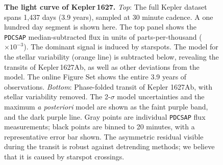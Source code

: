 \documentclass[12pt,modern,twocolumn,tighten]{aastex63}
\newcommand{\pn}{Kepler\,1627Ab} %
\begin{document}
\begin{figure}[tp]
	\begin{center}
		\leavevmode
	
	\end{center}
	\vspace{-0.7cm}
  \caption{ {\bf The light curve of Kepler\,1627.}
    {\it Top}: 
    The full Kepler dataset spans 1{,}437 days (3.9 years), sampled at
    30 minute cadence.  A one hundred day segment is shown here.  The
    top panel shows the \texttt{PDCSAP} median-subtracted flux in
    units of parts-per-thousand ($\times 10^{-3}$).  The dominant
    signal is induced by starspots.  The model for the stellar
    variability (orange line) is subtracted below, revealing the
    transits of \pn, as well as other deviations from the model.  The
    online Figure Set shows the entire 3.9 years of observations.
    {\it Bottom}:
    Phase-folded transit of Kepler 1627Ab, with stellar variability
    removed.  The 2-$\sigma$ model uncertainties and the maximum {\it
    a posteriori} model are shown as the faint purple band, and the
    dark purple line.  Gray points are individual \texttt{PDCSAP} flux
    measurements; black points are binned to 20 minutes, with a
    representative error bar shown.  The asymmetric residual visible
    during the transit is robust against detrending methods; we
    believe that it is caused by starspot crossings.
    \label{fig:lc}
  }
\end{figure}
\end{document}
